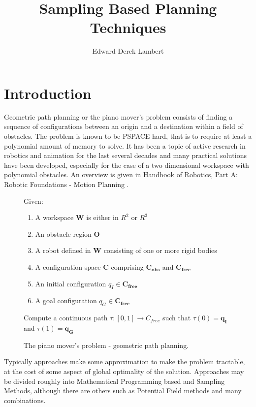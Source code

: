 \documentclass[11pt]{article} %
\title{Sampling Based Planning Techniques}
\author{Edward Derek Lambert}
\begin{document}
\maketitle
\section{Introduction}
Geometric path planning or the piano mover's problem consists of finding a sequence of configurations between an origin and a destination within a field of obstacles. The problem is known to be PSPACE hard, that is to require at least a polynomial amount of memory to solve. It has been a topic of active research in robotics and animation for the last several decades and many practical  solutions have been developed, especially for the case of a two dimensional workspace with polynomial obstacles. An overview is given in Handbook of Robotics, Part A: Robotic Foundations - Motion Planning \cite{SicilianoKhatib2016}. 

\begin{figure}
\label{fig:problem_statement}
Given:
\begin{enumerate}
\item A workspace $\mathbf{W}$ is either in $R^2$ or $R^3$
\item An obstacle region $\mathbf{O}$
\item A robot defined in $\mathbf{W}$ consisting of one or more rigid bodies
\item A configuration space $\mathbf{C}$ comprising $\mathbf{C_{obs}}$ and $\mathbf{C_{free}}$
\item An initial configuration $q_I \in \mathbf{C_{free}}$
\item A goal configuration $q_G \in \mathbf{C_{free}}$
\end{enumerate}
Compute a continuous path $\tau : [ 0, 1] \rightarrow C_{free}$ such that $\tau(0)=\mathbf{q_I}$ and $\tau(1) = \mathbf{q_G}$
\caption{The piano mover's problem - geometric path planning.\cite{SicilianoKhatib2016}}
\end{figure}
Typically approaches make some approximation to make the problem tractable, at the cost of some aspect of global optimality of the solution. Approaches may be divided roughly into Mathematical Programming based and Sampling Methods, although there are others such as Potential Field methods and many combinations.
\end{document}
